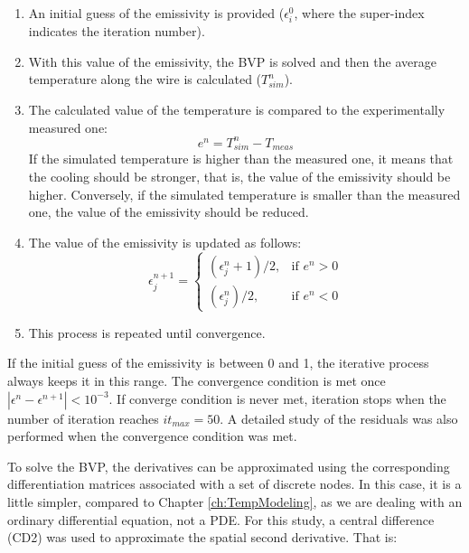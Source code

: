 \begin{enumerate}
    \item An initial guess of the emissivity is provided ($\epsilon_i^0$, where the super-index indicates the iteration number).
    \item With this value of the emissivity, the BVP is solved and then the average temperature along the wire is calculated ($T^{n}_{sim}$). 
    \item The calculated value of the temperature is compared to the experimentally measured one: 
    \begin{equation}
        e^{n} = T^{n}_{sim} - T_{meas}
    \end{equation}
    If the simulated temperature is higher than the measured one, it means that the cooling should be stronger, that is, the value of the emissivity should be higher. Conversely, if the simulated temperature is smaller than the measured one, the value of the emissivity should be reduced. 

    \item The value of the emissivity is updated as follows: 
        \begin{equation}
               \epsilon^{n+1}_j = \begin{cases}  (\epsilon^n_j + 1)/2, & \mbox{if } e^n > 0\\ (\epsilon^n_j)/2, & \mbox{if } e^n < 0 \end{cases}
         \end{equation}
    \item This process is repeated until convergence.
\end{enumerate}

If the initial guess of the emissivity is between 0 and 1, the iterative process always keeps it in this range. The convergence condition is met once $\left| \epsilon^{n} - \epsilon^{n+1}\right| < 10^{-3}$. If converge condition is never met, iteration stops when the number of iteration reaches $it_{max} = 50$. A detailed study of the residuals was also performed when the convergence condition was met.

To solve the BVP, the derivatives can be approximated using the corresponding differentiation matrices associated with a set of discrete nodes. In this case, it is a little simpler, compared to Chapter \ref{ch:TempModeling}, as we are dealing with an ordinary differential equation, not a PDE. For this study, a central difference (CD2) was used to approximate the spatial second derivative. That is: 

